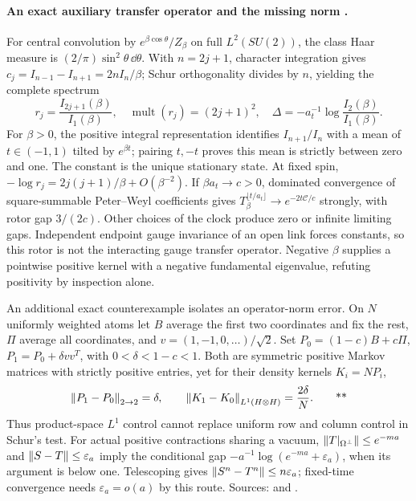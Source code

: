 \paragraph{An exact auxiliary transfer operator and the missing norm \workstar.}
For central convolution by \(e^{\beta\cos\theta}/Z_\beta\) on full
\(L^2(SU(2))\), the class Haar measure is
\((2/\pi)\sin^2\theta\,\dd\theta\).  With \(n=2j+1\), character integration
gives \(c_j=I_{n-1}-I_{n+1}=2nI_n/\beta\); Schur orthogonality divides by
\(n\), yielding the complete spectrum
\begin{equation}
 r_j=\frac{I_{2j+1}(\beta)}{I_1(\beta)},\quad
 \operatorname{mult}(r_j)=(2j+1)^2,\quad
 \Delta=-a_t^{-1}\log\frac{I_2(\beta)}{I_1(\beta)}.
 \label{early:convolution}
\end{equation}
For \(\beta>0\), the positive integral representation identifies
\(I_{n+1}/I_n\) with a mean of \(t\in(-1,1)\) tilted by \(e^{\beta t}\);
pairing \(t,-t\) proves this mean is strictly between zero and one.  The
constant is the unique stationary state.  At fixed spin,
\(-\log r_j=2j(j+1)/\beta+O(\beta^{-2})\).  If
\(\beta a_t\to c>0\), dominated convergence of square-summable Peter--Weyl
coefficients gives \(T_\beta^{\lfloor t/a_t\rfloor}\to e^{-2t\mathcal C/c}\)
strongly, with rotor gap \(3/(2c)\).  Other choices of the clock produce zero
or infinite limiting gaps.  Independent endpoint gauge invariance of an open
link forces constants, so this rotor is not the interacting gauge transfer
operator.  Negative \(\beta\) supplies a pointwise positive kernel with a
negative fundamental eigenvalue, refuting positivity by inspection alone.

An additional exact counterexample isolates an operator-norm error.  On
\(N\) uniformly weighted atoms let \(B\) average the first two coordinates
and fix the rest, \(\Pi\) average all coordinates, and
\(v=(1,-1,0,\ldots)/\sqrt2\).  Set
\(P_0=(1-c)B+c\Pi\), \(P_1=P_0+\delta vv^T\), with
\(0<\delta<1-c<1\).  Both are symmetric positive Markov matrices with
strictly positive entries, yet for their density kernels \(K_i=NP_i\),
\begin{equation}
 \left\lVert P_1-P_0\right\rVert_{2\to2}=\delta,
 \qquad \left\lVert K_1-K_0\right\rVert_{L^1(H\otimes H)}=\frac{2\delta}{N}.
 \qquad\text{**}\label{early:normcounter}
\end{equation}
Thus product-space \(L^1\) control cannot replace uniform row and column
control in Schur's test.  For actual positive contractions sharing a vacuum,
\(\left\lVert T|_{\Omega^\perp}\right\rVert\le e^{-ma}\) and
\(\left\lVert S-T\right\rVert\le\varepsilon_a\) imply the conditional gap
\(-a^{-1}\log(e^{-ma}+\varepsilon_a)\), when its argument is below one.
Telescoping gives \(\left\lVert S^n-T^n\right\rVert\le n\varepsilon_a\); fixed-time convergence
needs \(\varepsilon_a=o(a)\) by this route.  Sources:
 and
.


